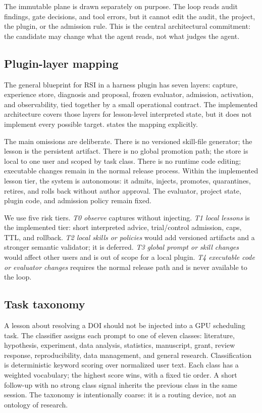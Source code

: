 The immutable plane is drawn separately on purpose. The loop reads audit findings, gate decisions, and tool errors, but it cannot edit the audit, the project, the plugin, or the admission rule. This is the central architectural commitment: the candidate may change what the agent reads, not what judges the agent.



\subsection{Plugin-layer mapping}
\label{sec:layers}
The general blueprint for RSI in a harness plugin has seven layers: capture, experience store, diagnosis and proposal, frozen evaluator, admission, activation, and observability, tied together by a small operational contract. The implemented architecture covers those layers for lesson-level interpreted state, but it does not implement every possible target.  states the mapping explicitly.



The main omissions are deliberate. There is no versioned skill-file generator; the lesson is the persistent artifact. There is no global promotion path; the store is local to one user and scoped by task class. There is no runtime code editing; executable changes remain in the normal release process. Within the implemented lesson tier, the system is autonomous: it admits, injects, promotes, quarantines, retires, and rolls back without author approval. The evaluator, project state, plugin code, and admission policy remain fixed.

We use five risk tiers. \emph{T0 observe} captures without injecting. \emph{T1 local lessons} is the implemented tier: short interpreted advice, trial/control admission, caps, TTL, and rollback. \emph{T2 local skills or policies} would add versioned artifacts and a stronger semantic validator; it is deferred. \emph{T3 global prompt or skill changes} would affect other users and is out of scope for a local plugin. \emph{T4 executable code or evaluator changes} requires the normal release path and is never available to the loop.

\subsection{Task taxonomy}
\label{sec:taxonomy}
A lesson about resolving a DOI should not be injected into a GPU scheduling task. The classifier assigns each prompt to one of eleven classes: literature, hypothesis, experiment, data analysis, statistics, manuscript, grant, review response, reproducibility, data management, and general research. Classification is deterministic keyword scoring over normalized user text. Each class has a weighted vocabulary; the highest score wins, with a fixed tie order. A short follow-up with no strong class signal inherits the previous class in the same session. The taxonomy is intentionally coarse: it is a routing device, not an ontology of research.

